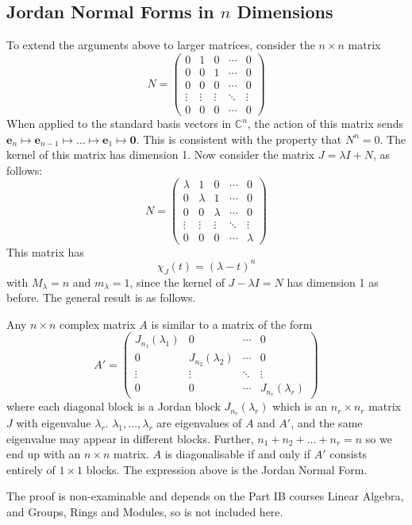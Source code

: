 \documentclass{article}
\begin{document}
	\subsection{Jordan Normal Forms in $n$ Dimensions}
	To extend the arguments above to larger matrices, consider the $n\times n$ matrix
	\[ N = \begin{pmatrix}
		0 & 1 & 0 & \cdots & 0 \\
		0 & 0 & 1 & \cdots & 0 \\
		0 & 0 & 0 & \cdots & 0 \\
		\vdots & \vdots & \vdots & \ddots & \vdots \\
		0 & 0 & 0 & \cdots & 0
	\end{pmatrix} \]
	When applied to the standard basis vectors in $\mathbb C^n$, the action of this matrix sends $\bm e_n \mapsto \bm e_{n-1} \mapsto \dots \mapsto \bm e_1 \mapsto \bm 0$. This is consistent with the property that $N^n = 0$. The kernel of this matrix has dimension 1. Now consider the matrix $J = \lambda I + N$, as follows:
	\[ N = \begin{pmatrix}
		\lambda & 1 & 0 & \cdots & 0 \\
		0 & \lambda & 1 & \cdots & 0 \\
		0 & 0 & \lambda & \cdots & 0 \\
		\vdots & \vdots & \vdots & \ddots & \vdots \\
		0 & 0 & 0 & \cdots & \lambda
	\end{pmatrix} \]
	This matrix has
	\[ \chi_J(t) = (\lambda - t)^n \]
	with $M_\lambda = n$ and $m_\lambda = 1$, since the kernel of $J - \lambda I = N$ has dimension 1 as before. The general result is as follows.
	\begin{theorem}
		Any $n\times n$ complex matrix $A$ is similar to a matrix of the form
		\[ A' = \left( \begin{array}{c|c|c|c}
			J_{n_1}(\lambda_1) & 0 & \cdots & 0 \\\hline
			0 & J_{n_2}(\lambda_2) & \cdots & 0 \\\hline
			\vdots & \vdots & \ddots & \vdots \\\hline
			0 & 0 & \cdots & J_{n_r}(\lambda_r)
		\end{array} \right) \]
		where each diagonal block is a Jordan block $J_{n_r}(\lambda_r)$ which is an $n_r \times n_r$ matrix $J$ with eigenvalue $\lambda_r$. $\lambda_1, \dots, \lambda_r$ are eigenvalues of $A$ and $A'$, and the same eigenvalue may appear in different blocks. Further, $n_1 + n_2 + \dots + n_r = n$ so we end up with an $n \times n$ matrix. $A$ is diagonalisable if and only if $A'$ consists entirely of $1 \times 1$ blocks. The expression above is the Jordan Normal Form.
	\end{theorem}
	The proof is non-examinable and depends on the Part IB courses Linear Algebra, and Groups, Rings and Modules, so is not included here.
\end{document}
